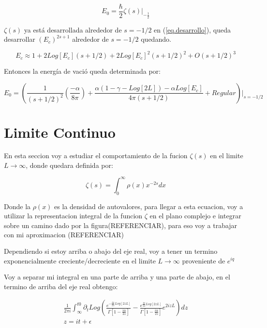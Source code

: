 \begin{equation}
    E _0 = \frac{\hbar}{2}  
    \zeta (s)  |  _{- \frac{1}{2}}
\end{equation}

$\zeta (s)$ ya está desarrollada alrededor de $s=-1/2$ en (\ref{eq.desarrollo}), queda desarrollar $(E_c) ^{2s+1} $ alrededor de $s=-1/2$ quedando.

\begin{equation}
    E _c \approx 
    1 + 2 Log[E_c] (s + 1/2) +
    2 Log[E_c] ^2 (s+1/2) ^2 + 
    O (s+1/2)^3
\end{equation}

Entonces la energía de vació queda determinada por:

\begin{equation}
    E _0 =
    \left(
    \frac{1}{(s+1/2)^2} 
    \left(
    \frac{- \alpha}{8 \pi}
    \right)+
    \frac{
    \alpha(1 -\gamma-Log[2L]) - 
    \alpha Log[E_c] 
    }{4 \pi (s+1/2)} 
     + Regular
    \right) | _{s=-1/2}
\end{equation}


\chapter{Limite Continuo}

En esta seccion voy a estudiar el comportamiento de la fucion $\zeta (s) $ en el limite $L \rightarrow \infty$, donde quedara definida por:

\begin{equation}
\zeta (s) = \int _{0} ^{\infty} \rho (x) x^{-2 s} dx
\end{equation}

Donde la $\rho(x) $ es la densidad de autovalores, para llegar a esta ecuacion, voy a utilizar la representacion integral de la funcion $\zeta$ en el plano complejo e integrar sobre un camino dado por la figura(REFERENCIAR), para eso voy a trabajar con mi aproximacion (REFERENCIAR)



Dependiendo si estoy arriba o abajo del eje real, voy a tener un termino exponencialmente creciente/decreciente en el limite $L \rightarrow \infty$ proveniente de $e ^{i q}$

Voy a separar mi integral en una parte de arriba y una parte de abajo, en el termino de arriba del eje real obtengo:

\begin{equation}
\begin{array}{c}
\frac{1}{2 \pi i} \int _{\infty} ^{t0} 
\partial _t
Log
\left(
\frac{e ^{- \frac{i \alpha}{2 \lambda} Log[2 z  L]} }{\Gamma[1-\frac{i \alpha}{2 z }]} -
\frac{e ^{ \frac{i \alpha}{2 z } Log[2 z  L]} }{\Gamma[1-\frac{i \alpha}{2 z }]}
e ^{2 i z  L }
\right) d z \\
z = i t + \epsilon 
\end{array}
\end{equation}

